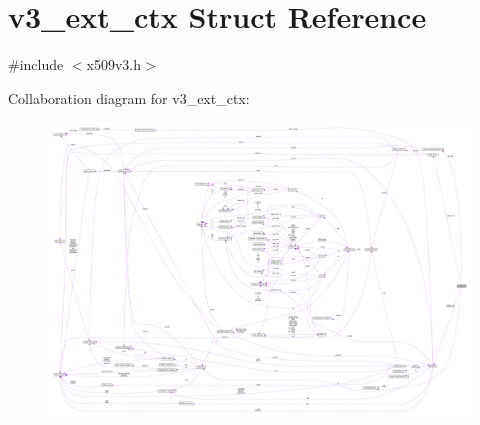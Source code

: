 \hypertarget{structv3__ext__ctx}{}\section{v3\+\_\+ext\+\_\+ctx Struct Reference}
\label{structv3__ext__ctx}


{\ttfamily \#include $<$x509v3.\+h$>$}



Collaboration diagram for v3\+\_\+ext\+\_\+ctx\+:\nopagebreak
\begin{figure}[H]
\begin{center}
\leavevmode
\includegraphics[width=350pt]{structv3__ext__ctx__coll__graph}
\end{center}
\end{figure}
